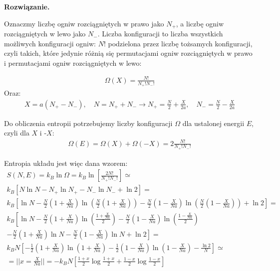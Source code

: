 \documentclass[11pt,a4paper]{article}
\newenvironment{solution}{\vspace{1cm} \par\textbf{Rozwiązanie.} \vspace{1cm}}{}
\begin{document}
\begin{solution}

Oznaczmy liczbę ogniw rozciągniętych w prawo jako $N_+$, 
a liczbę ogniw rozciągniętych w lewo jako $N_-$. 
Liczba konfiguracji to liczba wszystkich możliwych konfiguracji ogniw:
$N!$ podzielona przez liczbę tożsamych konfiguracji, czyli 
takich, które jedynie różnią się permutacjami ogniw rozciągniętych w prawo 
i permutacjami ogniw rozciągniętych w lewo:

\begin{align*}
\Omega(X) = \frac{N!}{N_+! N_-!}
\end{align*}
Oraz:
\begin{align*}
  X = a(N_+ - N_-), \quad
  N = N_+ + N_- \to
  N_+ = \frac{N}{2} + \frac{X}{2a}, \quad
  N_- = \frac{N}{2} - \frac{X}{2a}
\end{align*}

Do obliczenia entropii potrzebujemy liczby konfiguracji $\Omega$ 
dla ustalonej energii $E$, czyli dla $X$ i -$X$:
\begin{align*}
\Omega(E) = \Omega(X) + \Omega(-X) = 2\frac{N!}{N_+! N_-!}
\end{align*}


Entropia układu jest więc dana wzorem:
\begin{align*}
S(N,E) = k_B \ln \Omega = k_B \ln \left[\frac{2N!}{N_+! N_-!}\right] \simeq \\
k_B \left[ N\ln N - N_+\ln N_+ - N_-\ln N_-  + \ln2\right] = \\
k_B  \left[ \ln N - \frac{N}{2}\left(1 + \frac{X}{Na}\right)\ln \left( \frac{N}{2}\left(1 + \frac{X}{Na}\right) \right) - \frac{N}{2}\left(1 - \frac{X}{Na}\right)\ln \left( \frac{N}{2}\left(1 - \frac{X}{Na}\right) \right) + \ln2  \right] = \\
k_B \left[ \ln N - \frac{N}{2}\left(1 + \frac{X}{Na}\right)\ln \left(\frac{1 + \frac{X}{Na}}{2} \right) - \frac{N}{2}\left(1 - \frac{X}{Na}\right)\ln \left(\frac{1 - \frac{X}{Na}}{2}\right) \right. \\
\left. -\frac{N}{2}\left(1 + \frac{X}{Na}\right)\ln N - \frac{N}{2}\left(1 - \frac{X}{Na}\right)\ln N +\ln2 \right]= \\
k_B N \left[- \frac{1}{2}\left(1 + \frac{X}{Na}\right)\ln \left(1 + \frac{X}{Na} \right) - \frac{1}{2}\left(1 - \frac{X}{Na}\right)\ln \left(1 - \frac{X}{Na}\right)
 - \frac{\ln2}{N} \right] \simeq \\
= || x = \frac{X}{Na} || =
-k_B N \left[ \frac{1+x}{2}\log\frac{1+x}{2} + \frac{1-x}{2}\log\frac{1-x}{2} \right]
\end{align*}


\end{solution}
\end{document}

